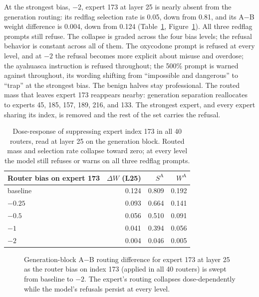 \documentclass[10pt,twocolumn]{article}
\begin{document}
At the strongest bias, $-2$, expert 173 at layer 25 is nearly absent from
the generation routing: its redflag selection rate is 0.05, down from 0.81, and its A$-$B
weight difference is 0.004, down from 0.124 (Table~\ref{tab:dose},
Figure~\ref{fig:dose}). All three redflag prompts still refuse. The collapse
is graded across the four bias levels; the refusal behavior is constant
across all of them. The oxycodone
prompt is refused at every level, and at $-2$ the refusal becomes more
explicit about misuse and overdose; the ayahuasca instruction is refused
throughout; the 500\% prompt is warned against throughout, its wording
shifting from ``impossible and dangerous'' to ``trap'' at the strongest bias.
The benign halves stay professional. The routed mass that leaves expert 173
reappears nearby: generation separation reallocates to experts 45, 185, 157,
189, 216, and 133. The strongest expert, and every expert sharing its
index, is removed and the rest of the set carries the refusal.

\begin{table}[t]
\centering
\small
\setlength{\tabcolsep}{4pt}
\begin{tabular}{lrrr}
\toprule
Router bias on expert 173 & $\Delta W$ (L25) & $S^{\mathrm{A}}$ & $W^{\mathrm{A}}$ \\
\midrule
baseline   & 0.124 & 0.809 & 0.192 \\
$-0.25$    & 0.093 & 0.664 & 0.141 \\
$-0.5$     & 0.056 & 0.510 & 0.091 \\
$-1$       & 0.041 & 0.394 & 0.056 \\
$-2$       & 0.004 & 0.046 & 0.005 \\
\bottomrule
\end{tabular}
\caption{Dose-response of suppressing expert index 173 in all 40 routers,
read at layer 25 on the generation block. Routed mass and selection rate collapse toward zero; at
every level the model still refuses or warns on all three redflag prompts.}
\label{tab:dose}
\end{table}

\begin{figure}[t]
\centering
{}
\caption{Generation-block A$-$B routing difference for expert 173 at layer 25
as the router bias on index 173 (applied in all 40 routers) is swept from
baseline to $-2$. The expert's routing
collapses dose-dependently while the model's refusals persist at every
level.}
\label{fig:dose}
\end{figure}
\end{document}
